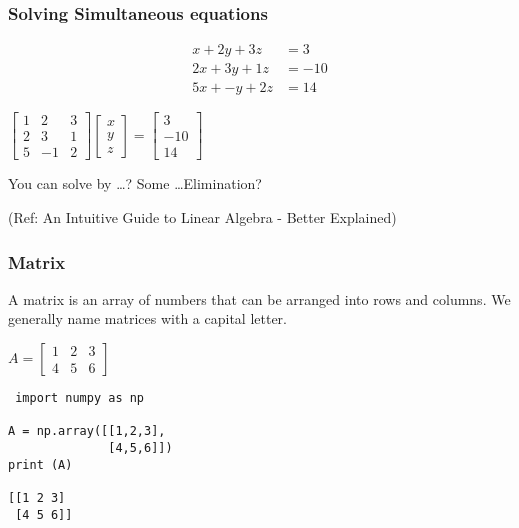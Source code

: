 \begin{frame}[fragile]\frametitle{Solving Simultaneous equations}

\begin{align*}
   x + 2y + 3z &= 3 \\
	 2x + 3y + 1z &= - 10 \\
	 5x + -y + 2z &= 14 
\end{align*}


$
\begin{bmatrix}
  1 & 2 & 3 \\
  2 & 3 & 1 \\
	5 & -1 & 2
 \end{bmatrix}
 \begin{bmatrix}
  x \\
	y \\
	z
 \end{bmatrix}
 =
 \begin{bmatrix}
  3 \\
	-10 \\
	14
 \end{bmatrix}
$

You can solve by \ldots? Some \ldots Elimination?
 
{\tiny (Ref: An Intuitive Guide to Linear Algebra - Better Explained)}

\end{frame}



 \begin{frame}[fragile] \frametitle{Matrix }
A matrix is an array of numbers that can be arranged into rows
and columns. We generally name matrices with a capital letter.

$A = \begin{bmatrix}
  1 & 2 & 3 \\
  4 & 5 & 6
 \end{bmatrix}$
 
\begin{lstlisting}
 import numpy as np

A = np.array([[1,2,3],
              [4,5,6]])
print (A)

[[1 2 3]
 [4 5 6]]
\end{lstlisting}


\end{frame}

